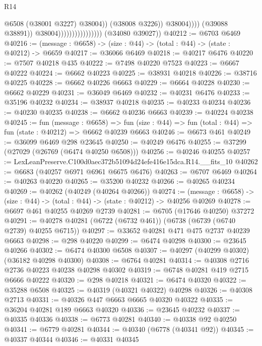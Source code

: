 \begin{lexlean}{R14}
\begin{coremodule}
                                                      @6508
                                                      (@38001 @3227)
                                                      @38004))
                                                  (@38008 @3226))
                                                @38004))))
                                        (@39088 @38891))
                                      @38004))))))))))))))))
      (@34080 @39027))
@40212 := @6703 @6469
@40216 := (message : @6658) -> (size : @44) -> (total : @44) -> (state : @40212) -> @6659
@40217 := @36066 @6469
@40218 := @40217 @6476
@40220 := @7507 @40218 @435
@40222 := @7498 @40220 @7523
@40223 := @6667 @40222
@40224 := @6662 @40223
@40225 := @38931 @40218
@40226 := @38716 @40225
@40228 := @6662 @40226 @6663
@40229 := @6664 @40228
@40230 := @6662 @40229
@40231 := @36049 @6469
@40232 := @40231 @6476
@40233 := @35196 @40232
@40234 := @38937 @40218
@40235 := @40233 @40234
@40236 := @40230 @40235
@40238 := @6662 @40236 @6663
@40239 := @40224 @40238
@40245 := fun (message : @6658) =>
  fun (size : @44) => fun (total : @44) => fun (state : @40212) => @6662 @40239 @6663
@40246 := @6673 @461
@40249 := @36099 @6469 @298 @23645
@40250 := @40249 @6476
@40255 := @37299 (@27029 (@26769 (@6474 @40250 @6508)))
@40256 := @40246 @40255
@40257 := LexLeanPreserve.C100d0aec372b51094d24efe416e15dca.R14.__fits_10
@40262 := @6683 (@40257 @6971 @6961 @6675 @6476)
@40263 := @6707 @6469
@40264 := @40263 @40220
@40265 := @35200 @40232
@40266 := @40265 @40234
@40269 := @40262 (@40249 (@40264 @40266))
@40274 := (message : @6658) -> (size : @44) -> (total : @44) -> (state : @40212) -> @40256 @40269
@40278 := @6697 @461 @40255 @40269 @2739
@40281 := @6705 (@17646 @40250) @37272
@40291 := @40278 @40281 (@6722 (@6732 @461)) (@6738 (@6739 (@6740 @2739) @40255 @6715))
@40297 := @33652 @40281 @471 @475 @2737 @40239 @6663
@40298 := @298 @40220
@40299 := @6474 @40298
@40300 := @23645 @40266
@40302 := @6474 @40300 @6508
@40307 := @40297 (@40299 @40302) (@36182 @40298 @40300)
@40308 := @6764 @40281
@40314 := @40308 @2716 @2736 @40223 @40238 @40298 @40302
@40319 := @6748 @40281 @419 @2715 @6666 @40222
@40320 := @298 @40218
@40321 := @6474 @40320
@40322 := @35288 @6508
@40325 := @40319 (@40321 @40322) @40298
@40326 := @40308 @2713
@40331 := @40326 @447 @6663 @6665 @40320 @40322
@40335 := @36204 @40281 @189 @6663 @40320
@40336 := @23645 @40232
@40337 := @40335 @40336
@40338 := @6773 @40281
@40340 := @40338 @92 @40250
@40341 := @6779 @40281
@40344 := @40340 (@6778 (@40341 @92))
@40345 := @40337 @40344
@40346 := @40331 @40345

\end{coremodule}
\end{lexlean}
